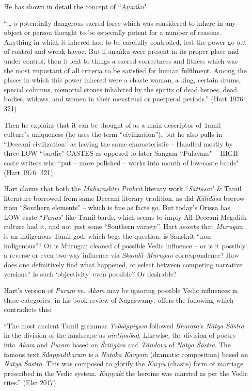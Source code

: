 He has shown in detail the concept of “\textit{Aṇaṅku}"

“… a potentially dangerous sacred force which was considered to inhere in any object or person thought to be especially potent for a number of reasons. Anything in which it inhered had to be carefully controlled, lest the power go out of control and wreak havoc. But if aṇaṅku were present in its proper place and under control, then it lent to things a sacred correctness and fitness which was the most important of all criteria to be satisfied for human fulfilment. Among the places in which this power inhered were a chaste woman, a king, certain drums, special columns, memorial stones inhabited by the spirits of dead heroes, dead bodies, widows, and women in their menstrual or puerperal periods.” (Hart 1976: 321)

Then he explains that it can be thought of as a main descriptor of Tamil culture’s uniqueness (he uses the term “civilization”), but he also pulls in “Deccani civilization” as having the same characteristic – Handled mostly by three LOW “bardic" CASTES as opposed to later Sangam “Pulavans" – HIGH caste writers who “put – more polished – works into mouth of low-caste bards" (Hart 1976: 321).

Hart claims that both the \textit{Maharāshtri Prākrit} literary work “\textit{Sattasaī}" \& Tamil literature borrowed from same Deccani literary tradition, as did \textit{Kālidāsa } borrow from “Southern elements" – which is fine as facts go. But today’s Orissa has LOW-caste “\textit{Panas}" like Tamil bards, which seems to imply All Deccani Megalith culture had it, and not just some “Southern variety”. Hart asserts that \textit{Murugan} is an indigenous Tamil god, which begs the question: is Sanskrit “non indigenous”? Or is Murugan cleaned of possible Vedic influence – or is it possibly a reverse or even two-way influence via \textit{Skandā}–\textit{Murugan} correspondence? How does one definitively find what happened, or select between competing narrative versions? Is such ‘objectivity’ even possible? Or desirable?

Hart’s version of \textit{Puram} vs. \textit{Akam} may be ignoring possible Vedic influences in these categories. in his book review of Nagaswamy; offers the following which contradicts this:

\begin{myquote}
“The most ancient Tamil grammar \textit{Tolkāppiyam} followed \textit{Bharata}’s \textit{Nātya Śāstra} in the division of the landscape as \textit{aintiṇaikaḷ}. Likewise, the division of poetry into \textit{Akam} and \textit{Puram} based on \textit{Śriṅgāra } and \textit{Tāṇdava } of \textit{Nātya Śāstra}. The famous text \textit{Silappadikāram} is a \textit{Nāṭaka Kāvyam} (dramatic composition) based on \textit{Nātya Śāstra}. This was composed to glorify the \textit{Karpu} (chaste) form of marriage prescribed in the Vedic system. \textit{Kaṇṇaki} the heroine was married as per the Vedic rites.” \hfill (Elst 2017)
\end{myquote}

